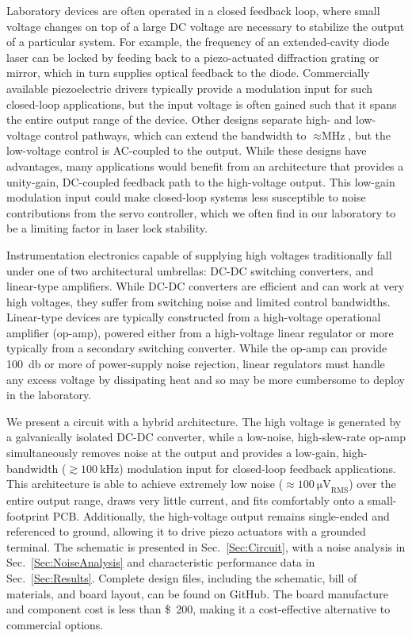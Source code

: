 \documentclass[aip,rsi,reprint]{revtex4-1} %
\begin{document}
Laboratory devices are often operated in a closed feedback loop, where small voltage changes on top of a large DC voltage are necessary to stabilize the output of a particular system.
For example, the frequency of an extended-cavity diode laser can be locked by feeding back to a piezo-actuated diffraction grating or mirror, which in turn supplies optical feedback to the diode.
Commercially available piezoelectric drivers typically provide a modulation input for such closed-loop applications, but the input voltage is often gained such that it spans the entire output range of the device.
Other designs separate high- and low-voltage control pathways, which can extend the bandwidth to $\approx\si{\mega\hertz}$, but the low-voltage control is AC-coupled to the output.\cite{Fleming2009a}
While these designs have advantages, many applications would benefit from an architecture that provides a unity-gain, DC-coupled feedback path to the high-voltage output.
This low-gain modulation input could make closed-loop systems less susceptible to noise contributions from the servo controller, which we often find in our laboratory to be a limiting factor in laser lock stability.

Instrumentation electronics capable of supplying high voltages traditionally fall under one of two architectural umbrellas: DC-DC switching converters, and linear-type amplifiers.
While DC-DC converters are efficient and can work at very high voltages, they suffer from switching noise and limited control bandwidths.
Linear-type devices are typically constructed from a high-voltage operational amplifier (op-amp), powered either from a high-voltage linear regulator or more typically from a secondary switching converter.
While the op-amp can provide \SI{100}{\decibel} or more of power-supply noise rejection\cite{PA84Datasheet}, linear regulators must handle any excess voltage by dissipating heat and so may be more cumbersome to deploy in the laboratory.

We present a circuit with a hybrid architecture.
The high voltage is generated by a galvanically isolated DC-DC converter, while a low-noise, high-slew-rate op-amp simultaneously removes noise at the output and provides a low-gain, high-bandwidth ($\gtrsim \SI{100}{\kilo\hertz}$) modulation input for closed-loop feedback applications.
This architecture is able to achieve extremely low noise ($\approx\SI{100}{\micro\volt}_{\text{RMS}}$) over the entire output range, draws very little current, and fits comfortably onto a small-footprint PCB.
Additionally, the high-voltage output remains single-ended and referenced to ground, allowing it to drive piezo actuators with a grounded terminal.
The schematic is presented in Sec.~\ref{Sec:Circuit}, with a noise analysis in Sec.~\ref{Sec:NoiseAnalysis} and characteristic performance data in Sec.~\ref{Sec:Results}.
Complete design files, including the schematic, bill of materials, and board layout, can be found on GitHub.\cite{PiezoDesignFiles}
The board manufacture and component cost is less than \SI{200}[\$]{}, making it a cost-effective alternative to commercial options. 
\end{document}
